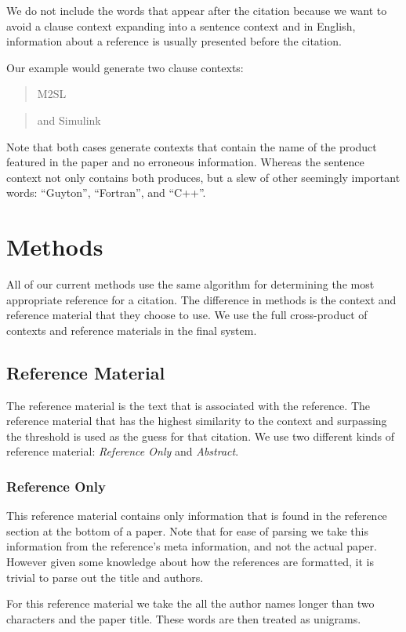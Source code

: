 \documentclass[10pt, conference, compsocconf]{IEEEtran}
\begin{document}
We do not include the words that appear after the citation because we want to avoid a clause context expanding into a sentence context and
in English, information about a reference is usually presented before the citation.

Our example would generate two clause contexts:
\begin{quote}
M2SL
\end{quote}

\begin{quote}
and Simulink
\end{quote}

Note that both cases generate contexts that contain the name of the product featured in the paper and no erroneous information. Whereas the
sentence context not only contains both produces, but a slew of other seemingly important words: ``Guyton'', ``Fortran'', and ``C++''.

\section{Methods}\label{sec:methods}
All of our current methods use the same algorithm for determining the most appropriate reference for a citation.
The difference in methods is the context and reference material that they choose to use.
We use the full cross-product of contexts and reference materials in the final system.

\subsection{Reference Material}
The reference material is the text that is associated with the reference.
The reference material that has the highest similarity to the context and surpassing the threshold is
used as the guess for that citation.
We use two different kinds of reference material: \textit{Reference Only} and \textit{Abstract}.

\subsubsection{Reference Only}
This reference material contains only information that is found in the reference section at the bottom of a paper.
Note that for ease of parsing we take this information from the reference's meta information, and not the actual paper. However given
some knowledge about how the references are formatted, it is trivial to parse out the title and authors.

For this reference material we take the all the author names longer than two characters and the paper title.
These words are then treated as unigrams.
\end{document}
